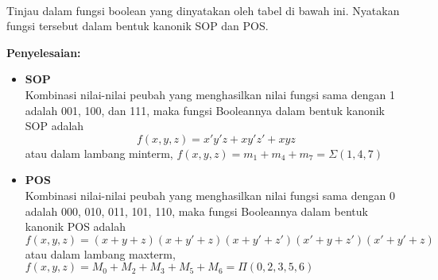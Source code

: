 \documentclass[11pt]{article}
\theoremstyle{definitionstyle}
\theoremstyle{theoremstyle}
\theoremstyle{examplestyle}
\begin{document}
\begin{example} \hfill \\  
    Tinjau dalam fungsi boolean yang dinyatakan oleh tabel di bawah ini. Nyatakan fungsi tersebut dalam bentuk kanonik SOP dan  POS. \\
\end{example}
\textbf{Penyelesaian:}
\begin{itemize}[left=0pt, itemsep=1.5pt, topsep=1.5pt]
    \item \textbf{SOP} \\
    Kombinasi nilai-nilai peubah yang menghasilkan nilai fungsi sama dengan 1 adalah 001, 100, dan 111, maka fungsi Booleannya dalam bentuk kanonik SOP adalah
    $$f(x, y, z) = x'y'z + xy'z' + xyz$$
    atau dalam lambang minterm, $f(x, y, z) = m_1 + m_4 + m_7 = \Sigma(1, 4, 7)$
    \item \textbf{POS} \\
    Kombinasi nilai-nilai peubah yang menghasilkan nilai fungsi sama dengan 0 adalah 000, 010, 011, 101, 110, maka fungsi Booleannya dalam bentuk kanonik POS adalah
    $$f(x, y, z) = (x + y + z)(x + y' + z)(x + y' + z')(x' + y + z')(x' + y' + z)$$
    atau dalam lambang maxterm, $f(x, y, z) = M_0 + M_2 + M_3 + M_5 + M_6 = \Pi(0, 2, 3, 5, 6)$ \\
\end{itemize} 
\end{document}
